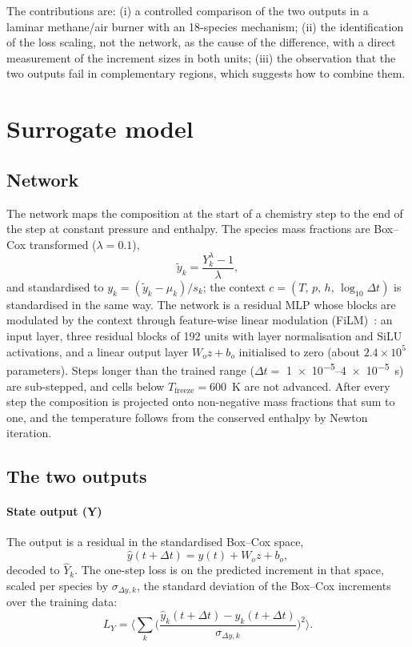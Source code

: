 \documentclass[preprint,review,12pt]{elsarticle}
\begin{document}
The contributions are: (i) a controlled comparison of the two outputs in a laminar methane/air burner
with an 18-species mechanism; (ii) the identification of the loss scaling, not the network, as the
cause of the difference, with a direct measurement of the increment sizes in both units; (iii) the
observation that the two outputs fail in complementary regions, which suggests how to combine them.

\section{Surrogate model}
\label{sec:model}

\subsection{Network}
The network maps the composition at the start of a chemistry step to the end of the step at constant
pressure and enthalpy. The species mass fractions are Box--Cox transformed ($\lambda=0.1$),
\begin{equation}
  \tilde y_k = \frac{Y_k^{\lambda}-1}{\lambda},
\end{equation}
and standardised to $y_k=(\tilde y_k-\mu_k)/s_k$; the context $c=(T,\,p,\,h,\,\log_{10}\Delta t)$ is
standardised in the same way. The network is a residual MLP whose blocks are modulated by the context
through feature-wise linear modulation (FiLM)~\cite{perez2018film}: an input layer, three residual
blocks of 192 units with layer normalisation and SiLU activations, and a linear output layer $W_o z+b_o$
initialised to zero (about $2.4\times10^5$ parameters). Steps longer than the trained range
($\Delta t=$ \num{1e-5}--\num{4e-5}~s) are sub-stepped, and cells below $T_\mathrm{freeze}=600$~K
are not advanced. After every step the composition is projected onto non-negative mass fractions that
sum to one, and the temperature follows from the conserved enthalpy by Newton iteration.

\subsection{The two outputs}
\paragraph{State output (Y)} The output is a residual in the standardised Box--Cox space,
\begin{equation}
  \hat y(t+\Delta t) = y(t) + W_o z + b_o ,
\end{equation}
decoded to $\hat Y_k$. The one-step loss is on the predicted increment in that space, scaled per species
by $\sigma_{\Delta y,k}$, the standard deviation of the Box--Cox increments over the training data:
\begin{equation}
  L_Y = \Big\langle \sum_k \Big(\frac{\hat y_k(t+\Delta t)-y_k(t+\Delta t)}{\sigma_{\Delta y,k}}\Big)^2\Big\rangle .
  \label{eq:lossY}
\end{equation}
\end{document}
